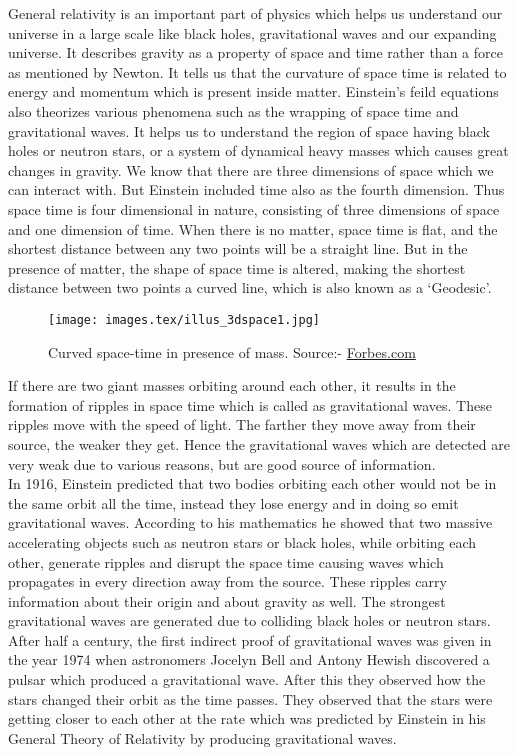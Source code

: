 \hspace{0.5cm} General relativity is an important part of physics which helps us understand our universe in a large scale like black holes, gravitational waves and our expanding universe. It describes gravity as a property of space and time rather than a force as mentioned by Newton. It tells us that the curvature of space time is related to energy and momentum which is present inside matter. Einstein's feild equations also theorizes various phenomena such as the wrapping of space time and gravitational waves. It helps us to understand the region of space having black holes or neutron stars, or a system of dynamical heavy masses which causes great changes in gravity. We know that there are three dimensions of space which we can interact with. But Einstein included time also as the fourth dimension. Thus space time is four dimensional in nature, consisting of three dimensions of space and one dimension of time. When there is no matter, space time is flat, and the shortest distance between any two points will be a straight line. But in the presence of matter, the shape of space time is altered, making the shortest distance between two points a curved line, which is also known as a `Geodesic'.

\begin{figure}[h]
    \centering
    \texttt{[image: images.tex/illus\_3dspace1.jpg]}
    \caption{Curved space-time in presence of mass. Source:- \href{https://www.forbes.com/sites/startswithabang/2019/02/16/ask-ethan-how-can-we-measure-the-curvature-of-gravity/?sh=13c20ec1134f}{Forbes.com}}
\end{figure}

If there are two giant masses orbiting around each other, it results in the formation of ripples in space time which is called as gravitational waves. These ripples move with the speed of light. The farther they move away from their source, the weaker they get. Hence the gravitational waves which are detected are very weak due to various reasons, but are good source of information.\\ 

In 1916, Einstein predicted that two bodies orbiting each other would not be in the same orbit all the time, instead they lose energy and in doing so emit gravitational waves. According to his mathematics he showed that two massive accelerating objects such as neutron stars or black holes, while orbiting each other, generate ripples and disrupt the space time causing waves which propagates in every direction away from the source. These ripples carry information about their origin and about gravity as well. The strongest gravitational waves are generated due to colliding black holes or neutron stars. After half a century, the first indirect proof of gravitational waves was given in the year 1974 when astronomers Jocelyn Bell and Antony Hewish discovered a pulsar which produced a gravitational wave. After this they observed how the stars changed their orbit as the time passes. They observed that the stars were getting closer to each other at the rate which was predicted by Einstein in his General Theory of Relativity by producing gravitational waves.\\ 

